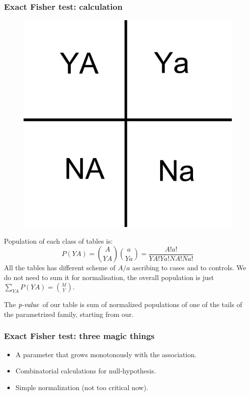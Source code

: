 \documentclass{beamer}
\newcommand{\pval}{\text{\textit{p-value}}}
\begin{document}
	\begin{frame}
	\frametitle{Exact Fisher test: calculation}
		\begin{center}
		\begin{figure}[ht]
			\includegraphics[scale=0.2]{fisher-contig}
		\end{figure}
		\end{center}

	Population of each class of tables is: 
	$$\displaystyle P(YA)=\binom{A}{YA}\binom{a}{Ya}=\frac{A!a!}{YA!Ya!NA!Na!}$$
	All the tables has different scheme of $A/a$ ascribing to cases and to controls. 
	We do not need to sum it for normalisation, the overall population is just $\displaystyle\sum_{YA}{P(YA)}=\binom{M}{Y}$.

	The $\pval$ of our table is sum of normalized populations of one of the tails of the parametrized family, starting from our.
	\end{frame}

	\begin{frame}
	\frametitle{Exact Fisher test: three magic things}
	\begin{itemize}
		\item A parameter that grows monotonously with the association.
		\item Combinatorial calculations for null-hypothesis.
		\item Simple normalization (not too critical now).
	\end{itemize}
	\end{frame}
\end{document}
